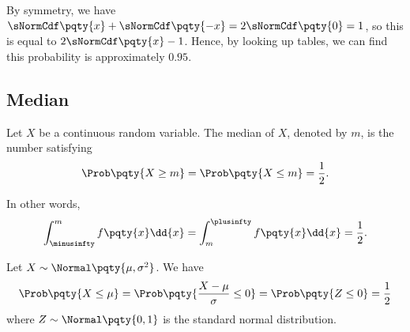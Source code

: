 By symmetry, we have \(\sNormCdf\pqty{x} + \sNormCdf\pqty{-x} = 2 \sNormCdf\pqty{0} = 1\), so this is equal to \(2 \sNormCdf\pqty{x} - 1\). Hence, by looking up tables, we can find this probability is approximately \(0.95\).

\subsection{Median}

\begin{definition}
    \label{def:median-continuous-rv}%
    Let \(X\) be a continuous random variable. The median of \(X\), denoted by \(m\), is the number satisfying
    \[
        \Prob\pqty{X \geq m} = \Prob\pqty{X \leq m} = \frac{1}{2}.
    \]

    In other words,
    \[
        \int_{\minusinfty}^{m} f\pqty{x} \dd{x} = \int_{m}^{\plusinfty} f\pqty{x} \dd{x} = \frac{1}{2}.
    \]
\end{definition}

\begin{example}
    \label{ex:median-standard-normal}%
    Let \(X \sim \Normal\pqty{\mu, \sigma^2}\). We have
    \[
        \Prob\pqty{X \leq \mu} = \Prob\pqty{\frac{X - \mu}{\sigma} \leq 0} = \Prob\pqty{Z \leq 0} = \frac{1}{2}
    \]
    where \(Z \sim \Normal\pqty{0, 1}\) is the standard normal distribution.
\end{example}